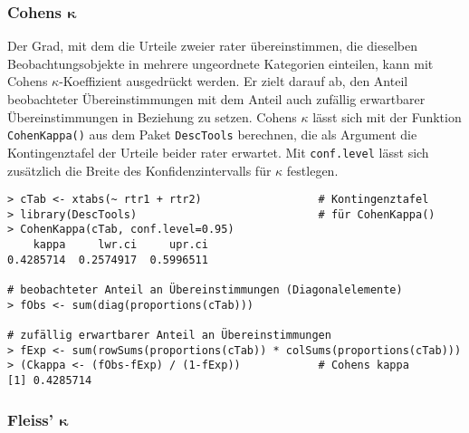 \subsubsection[Cohens \texorpdfstring{$\kappa$}{kappa}]{Cohens $\bm{\kappa}$}

Der Grad, mit dem die Urteile zweier rater übereinstimmen, die dieselben Beobachtungsobjekte in mehrere ungeordnete Kategorien einteilen, kann mit Cohens $\kappa$-Koeffizient ausgedrückt werden. Er zielt darauf ab, den Anteil beobachteter Übereinstimmungen mit dem Anteil auch zufällig erwartbarer Übereinstimmungen in Beziehung zu setzen. Cohens $\kappa$ lässt sich mit der Funktion \lstinline!CohenKappa()! aus dem Paket \lstinline!DescTools! berechnen, die als Argument die Kontingenztafel der Urteile beider rater erwartet. Mit \lstinline!conf.level! lässt sich zusätzlich die Breite des Konfidenzintervalls für $\kappa$ festlegen.
\begin{lstlisting}
> cTab <- xtabs(~ rtr1 + rtr2)                  # Kontingenztafel
> library(DescTools)                            # für CohenKappa()
> CohenKappa(cTab, conf.level=0.95)
    kappa     lwr.ci     upr.ci
0.4285714  0.2574917  0.5996511

# beobachteter Anteil an Übereinstimmungen (Diagonalelemente)
> fObs <- sum(diag(proportions(cTab)))

# zufällig erwartbarer Anteil an Übereinstimmungen
> fExp <- sum(rowSums(proportions(cTab)) * colSums(proportions(cTab)))
> (Ckappa <- (fObs-fExp) / (1-fExp))            # Cohens kappa
[1] 0.4285714
\end{lstlisting}

\subsubsection[Fleiss' \texorpdfstring{$\kappa$}{kappa}]{Fleiss' $\bm{\kappa}$}
\label{sec:kappaFleiss}

